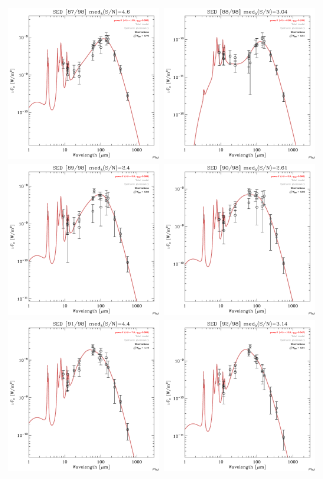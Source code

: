\documentclass[preprint2,longabstract]{aastex}
\begin{document}
\begin{figure}
    \includegraphics[trim=0 2mm 0 0, clip, width=40mm]{SEDs/sed_87.pdf}
	\includegraphics[trim=0 2mm 0 0, clip, width=40mm]{SEDs/sed_88.pdf}
	\includegraphics[trim=0 2mm 0 0, clip, width=40mm]{SEDs/sed_89.pdf}
	\includegraphics[trim=0 2mm 0 0, clip, width=40mm]{SEDs/sed_90.pdf}
	\includegraphics[trim=0 2mm 0 0, clip, width=40mm]{SEDs/sed_91.pdf}
	\includegraphics[trim=0 2mm 0 0, clip, width=40mm]{SEDs/sed_92.pdf}

\end{figure}
\end{document}
